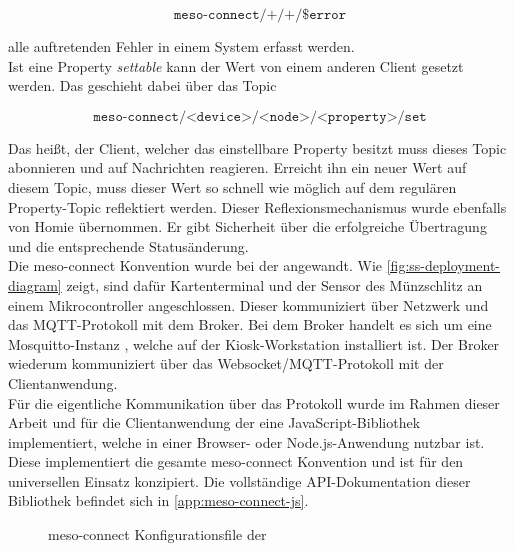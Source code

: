 \[\texttt{meso-connect/+/+/\$error} \]

alle auftretenden Fehler in einem System erfasst werden.\\

Ist eine Property \emph{settable} kann der Wert von einem anderen Client gesetzt werden. Das geschieht dabei 
über das Topic

\[\texttt{meso-connect/<device>/<node>/<property>/set} \]

Das heißt, der Client, welcher das einstellbare Property besitzt muss dieses Topic abonnieren und
auf Nachrichten reagieren. Erreicht ihn ein neuer Wert auf diesem Topic, muss dieser Wert so schnell wie 
möglich auf dem regulären Property-Topic reflektiert werden. Dieser Reflexionsmechanismus wurde ebenfalls 
von Homie übernommen. Er gibt Sicherheit über die erfolgreiche Übertragung und die entsprechende 
Statusänderung.\\

Die meso-connect Konvention wurde bei der \shst{} angewandt. Wie \autoref{fig:ss-deployment-diagram} zeigt,
sind dafür Kartenterminal und der Sensor des Münzschlitz an einem Mikrocontroller angeschlossen. Dieser
kommuniziert über Netzwerk und das MQTT-Protokoll mit dem Broker. Bei dem Broker handelt es sich um 
eine Mosquitto-Instanz \cite{mosquitto}, welche auf der Kiosk-Workstation installiert ist.
Der Broker wiederum kommuniziert über das Websocket/MQTT-Protokoll
mit der Clientanwendung.\\
Für die eigentliche Kommunikation über das Protokoll wurde im Rahmen dieser Arbeit und für die Clientanwendung 
der \shst{} eine JavaScript-Bibliothek implementiert, welche in einer Browser- oder Node.js-Anwendung
nutzbar ist. Diese implementiert die gesamte meso-connect Konvention und ist für den universellen Einsatz
konzipiert. Die vollständige API-Dokumentation dieser Bibliothek befindet sich in \autoref{app:meso-connect-js}.

\begin{figure}
  
  \caption{meso-connect Konfigurationsfile der \shst{}}
  \label{fig:shst-meso-connect-config}
\end{figure}

